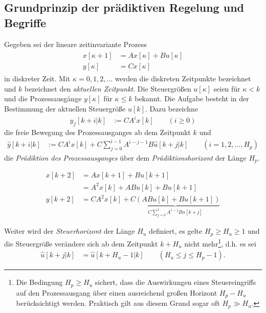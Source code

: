 \subsection{Grundprinzip der prädiktiven Regelung und Begriffe}
\label{subsec:grundprinzip_mpr}
Gegeben sei der lineare zeitinvariante Prozess
\begin{align}
	\begin{split}\label{eqn:kap_4_zustandsraummodell}
	x[\kappa+1] & = A x[\kappa] + B u[\kappa] \\
	y[\kappa] & = Cx[\kappa]
	\end{split}
\end{align}
in diskreter Zeit. Mit $\kappa=0,1,2,\ldots$ werden die diskreten Zeitpunkte bezeichnet und $k$ bezeichnet den \textit{aktuellen Zeitpunkt}. Die Steuergrößen $u[\kappa]$ seien für
$\kappa < k$ und die Prozessausgänge $y[\kappa]$ für $\kappa \le k$ bekannt. Die Aufgabe besteht in der Bestimmung der aktuellen Steuergröße $u[k]$. Dazu bezeichne
\begin{align}
	y_f[k +i|k] & := CA^ix[k]\qquad (i\ge 0)
\end{align}
die freie Bewegung des Prozessausganges ab dem Zeitpunkt $k$ und 
\begin{align}
	\hat{y}[k+i|k] & := CA^ix[k]+C\sum\limits_{j=0}^{i-1}A^{i-j-1}B\hat{u}[k+j|k]\qquad (i=1,2,\ldots,H_p) \label{eqn:kap_4_praediktion}
\end{align}
die \textit{Prädiktion des Prozessausganges} über dem \textit{Prädiktionshorizont} der Länge $H_p$.
\begin{exmp}[Prädiktionshorizont $H_p=2$]
\begin{align*}
	x[k+2] & = Ax[k+1]+Bu[k+1]\\
	& = A^2x[k]+ABu[k]+Bu[k+1]\\
	y[k+2] & = CA^2x[k]+\underbrace{C\left( ABu[k]+Bu[k+1] \right)}_{C\sum\limits_{j=0}^1A^{1-j}Bu[k+j]}
\end{align*}
\end{exmp}
Weiter wird der \textit{Steuerhorizont} der Länge $H_u$ definiert, es gelte $H_p\ge H_u \ge 1$ und die Steuergröße verändere sich ab dem Zeitpunkt $k+H_u$ nicht mehr\footnote{Die
Bedingung $H_p\ge H_u$ sichert, dass die Auswirkungen eines Steuereingriffs auf den Prozessausgang über einen ausreichend großen Horizont $H_p-H_u$
berücksichtigt werden. Praktisch gilt aus diesem Grund sogar oft $H_p \gg H_u$.}, d.h. es sei
\begin{align}
	\hat{u}[k+j|k] & = \hat{u}[k+H_u-1|k]\qquad (H_u\le j\le H_p-1).\label{eqn:kap_4_steuerhorizont}
\end{align}
